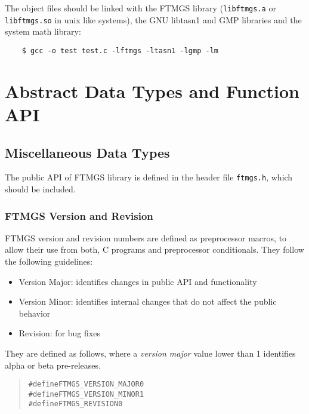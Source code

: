 \documentclass[a4paper]{article}
\newenvironment{code}%
{\begin{quote}\footnotesize\begin{alltt}}%
{\end{alltt}\end{quote}}%
\begin{document}
The object files should be linked with the FTMGS library
(\verb|libftmgs.a| or \verb|libftmgs.so| in unix like systems), the
GNU libtasn1 and GMP libraries and the system math library:
\begin{verbatim}
    $ gcc -o test test.c -lftmgs -ltasn1 -lgmp -lm
\end{verbatim}

\section{Abstract Data Types and Function API}

\subsection{Miscellaneous Data Types}

The public API of FTMGS library is defined in the header file
\verb|ftmgs.h|, which should be included.

\subsubsection*{FTMGS Version and Revision}

FTMGS version and revision numbers are defined as preprocessor macros,
to allow their use from both, C programs and preprocessor
conditionals. They follow the following guidelines:

{\footnotesize\begin{itemize}%
\item Version Major: identifies changes in public API and functionality
\item Version Minor: identifies internal changes that do not affect the public behavior
\item Revision: for bug fixes
\end{itemize}}%
They are defined as follows, where a \emph{version major} value lower
than 1 identifies alpha or beta pre-releases.
\begin{code}
#define FTMGS_VERSION_MAJOR     0
#define FTMGS_VERSION_MINOR     1
#define FTMGS_REVISION          0
\end{code}
\end{document}
